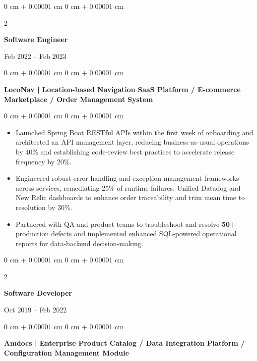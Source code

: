 \documentclass[10pt, letterpaper]{article}
\newenvironment{highlights}{
    \begin{itemize}[
        topsep=0.10 cm,
        parsep=0.10 cm,
        partopsep=0pt,
        itemsep=0pt,
        leftmargin=0 cm + 10pt
    ]
}{
    \end{itemize}
} %
\newenvironment{onecolentry}{
    \begin{adjustwidth}{
        0 cm + 0.00001 cm
    }{
        0 cm + 0.00001 cm
    }
}{
    \end{adjustwidth}
} %
\newenvironment{twocolentry}[2][]{
    \onecolentry
    \def\secondColumn{#2}
    \setcolumnwidth{\fill, 4.5 cm}
    \begin{paracol}{2}
}{
    \switchcolumn \raggedleft \secondColumn
    \end{paracol}
    \endonecolentry
} %
\begin{document}
        \vspace{0.1 cm}
        \begin{twocolentry}{Feb 2022 – Feb 2023}
            \textbf{Software Engineer}
            \end{twocolentry}
            \begin{onecolentry}
                \textbf{LocoNav | Location-based Navigation SaaS Platform / E-commerce Marketplace / Order Management System}
            \end{onecolentry}
        \vspace{0.10 cm}
        \begin{onecolentry}
            \begin{highlights}
                \item Launched Spring Boot RESTful APIs within the first week of onboarding and architected an API management layer, reducing business-as-usual operations by 40\% and establishing code-review best practices to accelerate release frequency by 20\%.
                
                
                \item Engineered robust error-handling and exception-management frameworks across services, remediating 25\% of runtime failures. Unified Datadog and New Relic dashboards to enhance order traceability and trim mean time to resolution by 30\%.

                \item Partnered with QA and product teams to troubleshoot and resolve \textbf{50+} production defects and implemented enhanced SQL-powered operational reports for data-backend decision-making.
            \end{highlights}
        \end{onecolentry}


        \vspace{0.1 cm}
        \begin{twocolentry}{Oct 2019 – Feb 2022}
            \textbf{Software Developer}
        \end{twocolentry}
        \begin{onecolentry}
                \textbf{Amdocs | Enterprise Product Catalog / Data Integration Platform / Configuration Management Module}

        \end{onecolentry}
\end{document}

